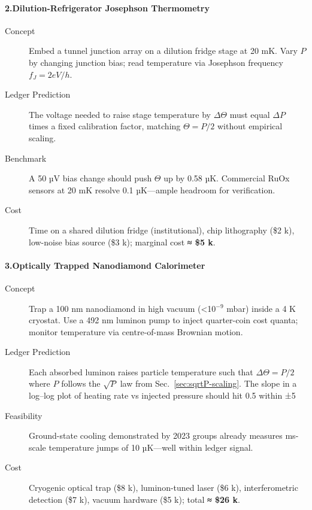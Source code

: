 \documentclass[11pt,oneside]{book}
\begin{document}
\paragraph*{2.\;Dilution-Refrigerator Josephson Thermometry}

\begin{description}
\item[Concept] Embed a tunnel junction array on a dilution fridge stage at 20 mK.  
               Vary \(P\) by changing junction bias; read temperature via Josephson frequency \(f_J = 2eV/h\).

\item[Ledger Prediction] The voltage needed to raise stage temperature by \(\Delta\Theta\) must equal \(\Delta P\) times a fixed calibration factor, matching \(\Theta = P/2\) without empirical scaling.

\item[Benchmark] A 50 µV bias change should push \(\Theta\) up by 0.58 µK.  Commercial RuOx sensors at 20 mK resolve 0.1 µK—ample headroom for verification.

\item[Cost] Time on a shared dilution fridge (institutional), chip lithography (\$2 k), low-noise bias source (\$3 k); marginal cost \textbf{≈ \$5 k}.
\end{description}

\paragraph*{3.\;Optically Trapped Nanodiamond Calorimeter}

\begin{description}
\item[Concept] Trap a 100 nm nanodiamond in high vacuum (<10\(^{-9}\) mbar) inside a 4 K cryostat.  
               Use a 492 nm luminon pump to inject quarter-coin cost quanta; monitor temperature via centre-of-mass Brownian motion.

\item[Ledger Prediction] Each absorbed luminon raises particle temperature such that \(\Delta\Theta = P/2\) where \(P\) follows the \(\sqrt{P}\) law from Sec.~\ref{sec:sqrtP-scaling}.  
                         The slope in a log–log plot of heating rate vs injected pressure should hit 0.5 within ±5 %

\item[Feasibility] Ground-state cooling demonstrated by 2023 groups already measures ms-scale temperature jumps of 10 µK—well within ledger signal.

\item[Cost] Cryogenic optical trap (\$8 k), luminon-tuned laser (\$6 k), interferometric detection (\$7 k), vacuum hardware (\$5 k); total \textbf{≈ \$26 k}.
\end{description}
\end{document}
